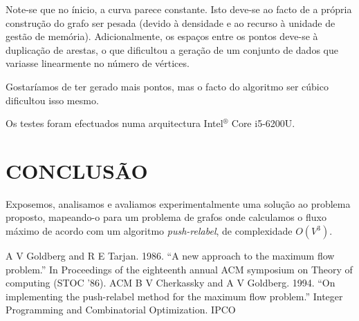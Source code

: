 \documentclass[a4paper, 12pt, conference, portuguese]{ieeeconf}
\begin{document}
Note-se que no ínicio, a curva parece constante. Isto deve-se ao
facto de a própria construção do grafo ser pesada (devido à
densidade e ao recurso à unidade de gestão de memória).
Adicionalmente, os espaços entre os pontos deve-se à duplicação
de arestas, o que dificultou a geração de um conjunto de dados
que variasse linearmente no número de vértices.

Gostaríamos de ter gerado mais pontos, mas o facto do
algoritmo ser cúbico dificultou isso mesmo.

Os testes foram efectuados numa arquitectura Intel$^\circledR$ Core\texttrademark
i5-6200U.


\section{CONCLUSÃO}\label{conclusion}

Exposemos, analisamos e avaliamos experimentalmente uma solução
ao problema proposto, mapeando-o para um problema de grafos onde
calculamos o fluxo máximo de acordo com um algoritmo
\textit{push-relabel}, de complexidade $O(V^3)$.


\begin{thebibliography}{99}
    A V Goldberg and R E Tarjan. 1986.
    ``A new approach to the maximum flow problem.''
    In Proceedings of the eighteenth annual ACM symposium on Theory of computing (STOC '86). ACM
   B V Cherkassky and A V Goldberg. 1994.
    ``On implementing the push-relabel method for the maximum
    flow problem.'' Integer Programming and Combinatorial
    Optimization. IPCO
\end{thebibliography}
\end{document}
